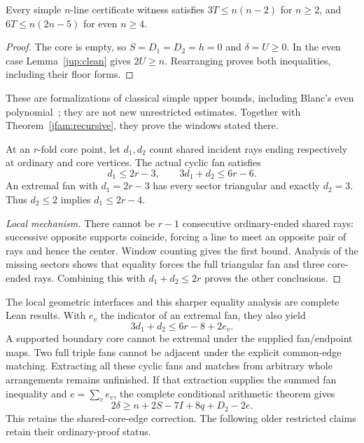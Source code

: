 \begin{theorem}\label{jup:simple}
Every simple $n$-line certificate witness satisfies $3T\le n(n-2)$ for $n\ge2$, and $6T\le n(2n-5)$ for even $n\ge4$.
\end{theorem}
\begin{proof}
The core is empty, so $S=D_1=D_2=h=0$ and $\delta=U\ge0$. In the even case Lemma~\ref{jup:clean} gives $2U\ge n$. Rearranging proves both inequalities, including their floor forms.
\end{proof}
These are formalizations of classical simple upper bounds, including Blanc's even polynomial~\cite{blanc2011}; they are not new unrestricted estimates. Together with Theorem~\ref{jfam:recursive}, they prove the windows stated there.

\begin{lemma}\label{jup:fan}
At an $r$-fold core point, let $d_1,d_2$ count shared incident rays ending respectively at ordinary and core vertices. The actual cyclic fan satisfies
\[
 d_1\le2r-3,\qquad3d_1+d_2\le6r-6.
\]
An extremal fan with $d_1=2r-3$ has every sector triangular and exactly $d_2=3$. Thus $d_2\le2$ implies $d_1\le2r-4$.
\end{lemma}
\begin{proof}[Local mechanism]
There cannot be $r-1$ consecutive ordinary-ended shared rays: successive opposite supports coincide, forcing a line to meet an opposite pair of rays and hence the center. Window counting gives the first bound. Analysis of the missing sectors shows that equality forces the full triangular fan and three core-ended rays. Combining this with $d_1+d_2\le2r$ proves the other conclusions.
\end{proof}
The local geometric interfaces and this sharper equality analysis are complete Lean results. With $e_v$ the indicator of an extremal fan, they also yield
\begin{equation}\label{jup:sharp-fan}
 3d_1+d_2\le6r-8+2e_v.
\end{equation}
A supported boundary core cannot be extremal under the supplied fan/endpoint maps. Two full triple fans cannot be adjacent under the explicit common-edge matching. Extracting all these cyclic fans and matches from arbitrary whole arrangements remains unfinished. If that extraction supplies the summed fan inequality and $e=\sum_v e_v$, the complete conditional arithmetic theorem gives
\begin{equation}\label{jup:exceptional}
 2\delta\ge n+2S-7I+8q+D_2-2e.
\end{equation}
This retains the shared-core-edge correction. The following older restricted claims retain their ordinary-proof status.

